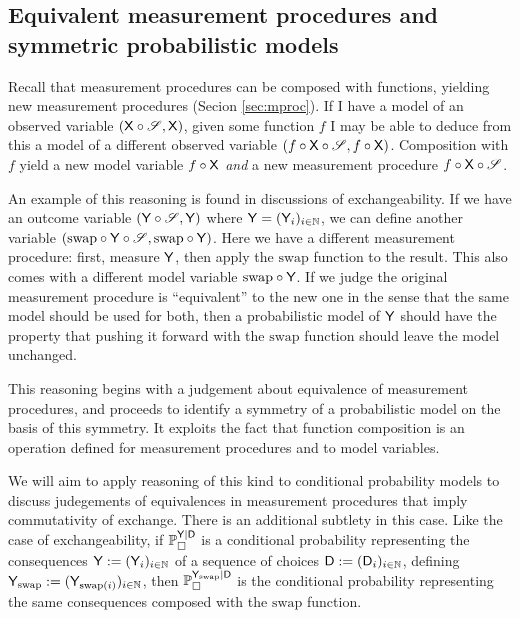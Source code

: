 \subsection{Equivalent measurement procedures and symmetric probabilistic models}

Recall that measurement procedures can be composed with functions, yielding new measurement procedures (Secion \ref{sec:mproc}). If I have a model of an observed variable $(\mathsf{X}\circ \mathscr{S},\mathsf{X})$, given some function $f$ I may be able to deduce from this a model of a different observed variable $(f\circ \mathsf{X}\circ\mathscr{S},f\circ\mathsf{X})$. Composition with $f$ yield a new model variable $f\circ\mathsf{X}$ \emph{and} a new measurement procedure $f\circ \mathsf{X}\circ\mathscr{S}$. 

An example of this reasoning is found in discussions of exchangeability. If we have an outcome variable $(\mathsf{Y}\circ\mathscr{S},\mathsf{Y})$ where $\mathsf{Y}=(\mathsf{Y}_i)_{i\in \mathbb{N}}$, we can define another variable $(\text{swap}\circ \mathsf{Y}\circ\mathscr{S},\text{swap}\circ\mathsf{Y})$. Here we have a different measurement procedure: first, measure $\mathsf{Y}$, then apply the $\text{swap}$ function to the result. This also comes with a different model variable $\text{swap}\circ\mathsf{Y}$. If we judge the original measurement procedure is ``equivalent'' to the new one in the sense that the same model should be used for both, then a probabilistic model of $\mathsf{Y}$ should have the property that pushing it forward with the $\text{swap}$ function should leave the model unchanged.

This reasoning begins with a judgement about equivalence of measurement procedures, and proceeds to identify a symmetry of a probabilistic model on the basis of this symmetry. It exploits the fact that function composition is an operation defined for measurement procedures and to model variables.

We will aim to apply reasoning of this kind to conditional probability models to discuss judegements of equivalences in measurement procedures that imply commutativity of exchange. There is an additional subtlety in this case. Like the case of exchangeability, if $\mathbb{P}_\square^{\mathsf{Y}|\mathsf{D}}$ is a conditional probability representing the consequences $\mathsf{Y}:=(\mathsf{Y}_i)_{i\in\mathbb{N}}$ of a sequence of choices $\mathsf{D}:=(\mathsf{D}_i)_{i\in\mathbb{N}}$, defining $\mathsf{Y}_{\text{swap}}:=(\mathsf{Y}_{\text{swap}(i)})_{i\in\mathbb{N}}$, then $\mathbb{P}_\square^{\mathsf{Y}_{\text{swap}}|\mathsf{D}}$ is the conditional probability representing the same consequences composed with the $\text{swap}$ function.

